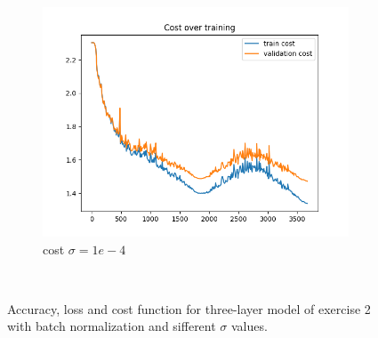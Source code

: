 \documentclass[a4paper]{article}
\begin{document}
\begin{figure}[h]
\begin{subfigure}{0.3\textwidth}
		\includegraphics[width=\linewidth]{images/sens_sigma_0.0001_use_bn_True_cost.png}
		\caption{cost $\sigma=1e-4$}
	\end{subfigure} \\
	
	\caption{Accuracy, loss and cost function for three-layer model of exercise 2 with batch normalization and sifferent $\sigma$ values.}
	\label{fig:sens_bn}
\end{figure}






%
%
\end{document}

